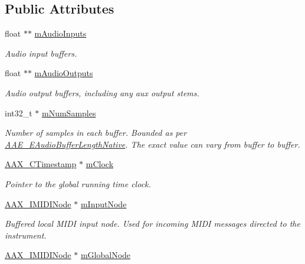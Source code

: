 \subsection*{Public Attributes}
\begin{DoxyCompactItemize}
\item 
float $\ast$$\ast$ \mbox{\hyperlink{a01965_a84a9670391f6c3ade12f8577e3c127a7}{m\+Audio\+Inputs}}
\begin{DoxyCompactList}\small\item\em Audio input buffers. \end{DoxyCompactList}\item 
float $\ast$$\ast$ \mbox{\hyperlink{a01965_a24be01ad79dac3d110302a4392a8c8cc}{m\+Audio\+Outputs}}
\begin{DoxyCompactList}\small\item\em Audio output buffers, including any aux output stems. \end{DoxyCompactList}\item 
int32\+\_\+t $\ast$ \mbox{\hyperlink{a01965_a7668a9950721f0a2819bee60fafc8e10}{m\+Num\+Samples}}
\begin{DoxyCompactList}\small\item\em Number of samples in each buffer. Bounded as per \mbox{\hyperlink{a00491_aa1769ee466fd07659d8c7ef5ac61cd49}{A\+A\+E\+\_\+\+E\+Audio\+Buffer\+Length\+Native}}. The exact value can vary from buffer to buffer. \end{DoxyCompactList}\item 
\mbox{\hyperlink{a00392_aae7325dbfa53a983f208a68cb563fba5}{A\+A\+X\+\_\+\+C\+Timestamp}} $\ast$ \mbox{\hyperlink{a01965_a4db77b69a4d4993b0fa6a5ab3573eb05}{m\+Clock}}
\begin{DoxyCompactList}\small\item\em Pointer to the global running time clock. \end{DoxyCompactList}\item 
\mbox{\hyperlink{a01845}{A\+A\+X\+\_\+\+I\+M\+I\+D\+I\+Node}} $\ast$ \mbox{\hyperlink{a01965_ab567e317ed0127a51bf0491a4d972f3b}{m\+Input\+Node}}
\begin{DoxyCompactList}\small\item\em Buffered local M\+I\+DI input node. Used for incoming M\+I\+DI messages directed to the instrument. \end{DoxyCompactList}\item 
\mbox{\hyperlink{a01845}{A\+A\+X\+\_\+\+I\+M\+I\+D\+I\+Node}} $\ast$ \mbox{\hyperlink{a01965_a48eed53d672bf4c844ec501d5dfe1784}{m\+Global\+Node}}

\end{DoxyCompactItemize}
